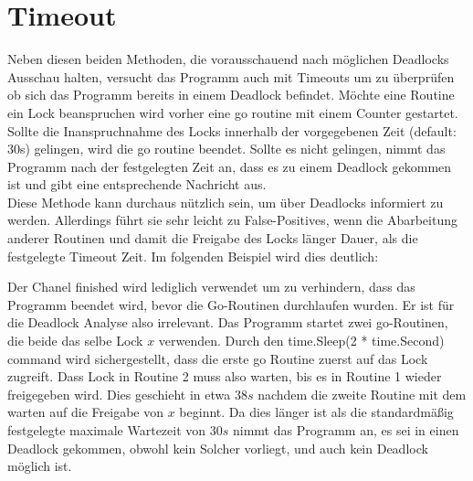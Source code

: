 \section{Timeout}
Neben diesen beiden Methoden, die vorausschauend nach möglichen Deadlocks 
Ausschau halten, versucht das Programm auch mit Timeouts um zu überprüfen ob 
sich das Programm bereits in einem Deadlock befindet. Möchte eine Routine ein 
Lock beanspruchen wird vorher eine go routine mit einem Counter gestartet.
Sollte die Inanspruchnahme des Locks innerhalb der vorgegebenen Zeit 
(default: 30s) gelingen, wird die go routine beendet. Sollte es nicht gelingen,
nimmt das Programm nach der festgelegten Zeit an, dass es zu einem Deadlock 
gekommen ist und gibt eine entsprechende Nachricht aus.\\
Diese Methode kann
durchaus nützlich sein, um über Deadlocks informiert zu werden. Allerdings führt
sie sehr leicht zu False-Positives, wenn die Abarbeitung anderer Routinen und 
damit die Freigabe des Locks länger Dauer, als die festgelegte Timeout Zeit.
Im folgenden Beispiel wird dies deutlich:
\begin{figure}[H]
    
\end{figure}
Der Chanel finished wird lediglich verwendet um zu verhindern, dass das Programm 
beendet wird, bevor die Go-Routinen durchlaufen wurden. Er ist für die Deadlock
Analyse also irrelevant. Das Programm startet zwei go-Routinen, die beide das 
selbe Lock $x$ verwenden. Durch den time.Sleep(2 * time.Second) command wird 
sichergestellt, dass die erste go Routine zuerst auf das Lock zugreift. 
Dass Lock in Routine 2 muss also warten, bis es in Routine 1 wieder freigegeben
wird. Dies geschieht in etwa $38 s$ nachdem die zweite Routine mit dem warten 
auf die Freigabe von $x$ beginnt. Da dies länger ist als die standardmäßig
festgelegte maximale Wartezeit von $30 s$ nimmt das Programm an, es sei in einen 
Deadlock gekommen, obwohl kein Solcher vorliegt, und auch kein Deadlock möglich 
ist.

